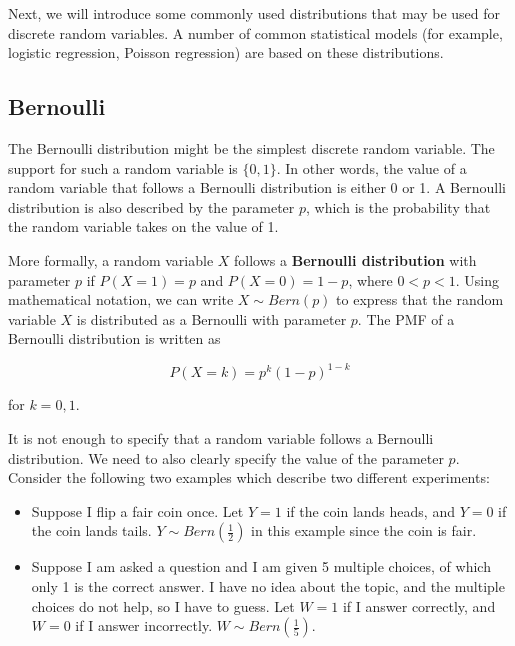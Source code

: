 \documentclass[
]{book}
\begin{document}
Next, we will introduce some commonly used distributions that may be used for discrete random variables. A number of common statistical models (for example, logistic regression, Poisson regression) are based on these distributions.

\hypertarget{bernoulli}{%
\subsection{Bernoulli}\label{bernoulli}}

The Bernoulli distribution might be the simplest discrete random variable. The support for such a random variable is \(\{0,1\}\). In other words, the value of a random variable that follows a Bernoulli distribution is either 0 or 1. A Bernoulli distribution is also described by the parameter \(p\), which is the probability that the random variable takes on the value of 1.

More formally, a random variable \(X\) follows a \textbf{Bernoulli distribution} with parameter \(p\) if \(P(X=1) = p\) and \(P(X=0) = 1-p\), where \(0<p<1\). Using mathematical notation, we can write \(X \sim Bern(p)\) to express that the random variable \(X\) is distributed as a Bernoulli with parameter \(p\). The PMF of a Bernoulli distribution is written as

\begin{equation} 
P(X=k) = p^k (1-p)^{1-k}
\label{eq:3-bern}
\end{equation}

for \(k=0, 1\).

It is not enough to specify that a random variable follows a Bernoulli distribution. We need to also clearly specify the value of the parameter \(p\). Consider the following two examples which describe two different experiments:

\begin{itemize}
\item
  Suppose I flip a fair coin once. Let \(Y=1\) if the coin lands heads, and \(Y=0\) if the coin lands tails. \(Y \sim Bern(\frac{1}{2})\) in this example since the coin is fair.
\item
  Suppose I am asked a question and I am given 5 multiple choices, of which only 1 is the correct answer. I have no idea about the topic, and the multiple choices do not help, so I have to guess. Let \(W=1\) if I answer correctly, and \(W=0\) if I answer incorrectly. \(W \sim Bern(\frac{1}{5})\).
\end{itemize}
\end{document}
